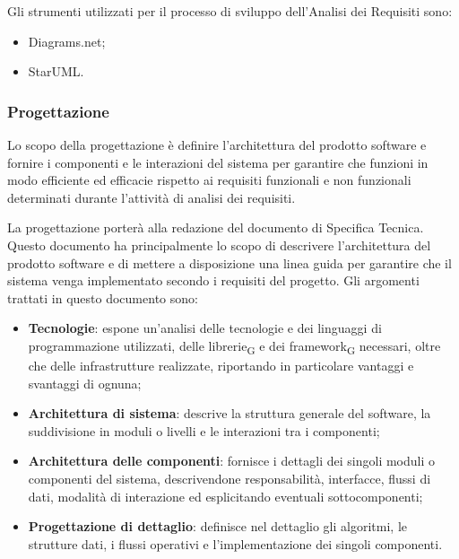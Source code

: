 Gli strumenti utilizzati per il processo di sviluppo dell'Analisi dei Requisiti sono:
\begin{itemize}
    \item Diagrams.net;
    \item StarUML.
\end{itemize}

\subsubsection{Progettazione}
Lo scopo della progettazione è definire l'architettura del prodotto software e fornire i componenti e le interazioni del sistema per garantire che funzioni in modo efficiente ed efficacie rispetto ai requisiti funzionali e non funzionali determinati durante l'attività di analisi dei requisiti.

La progettazione porterà alla redazione del documento di Specifica Tecnica. Questo documento ha principalmente lo scopo di descrivere l'architettura del prodotto software e di mettere a disposizione una linea guida per garantire che il sistema venga implementato secondo i requisiti del progetto. Gli argomenti trattati in questo documento sono:
\begin{itemize}
    \item \textbf{Tecnologie}: espone un'analisi delle tecnologie e dei linguaggi di programmazione utilizzati, delle librerie\textsubscript{G} e dei framework\textsubscript{G} necessari, oltre che delle infrastrutture realizzate, riportando in particolare vantaggi e svantaggi di ognuna;
    \item \textbf{Architettura di sistema}: descrive la struttura generale del software, la suddivisione in moduli o livelli e le interazioni tra i componenti;
    \item \textbf{Architettura delle componenti}: fornisce i dettagli dei singoli moduli o componenti del sistema, descrivendone responsabilità, interfacce, flussi di dati, modalità di interazione ed esplicitando eventuali sottocomponenti;
    \item \textbf{Progettazione di dettaglio}: definisce nel dettaglio gli algoritmi, le strutture dati, i flussi operativi e l'implementazione dei singoli componenti.
\end{itemize}

